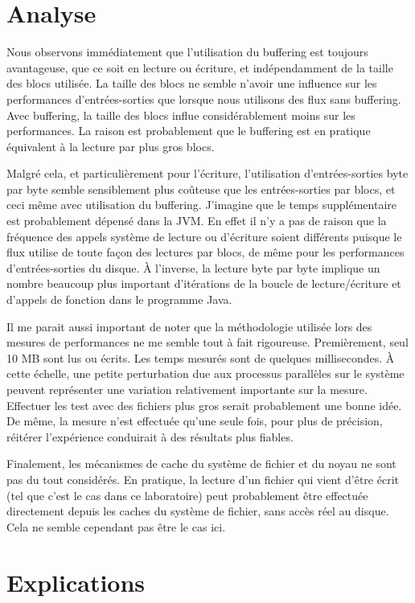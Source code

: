 \documentclass[a4paper,11pt]{article}
\begin{document}
\section{Analyse}

Nous observons immédiatement que l'utilisation du buffering est toujours avantageuse, que ce soit en lecture ou écriture, et indépendamment de la taille des blocs utilisée. La taille des blocs ne semble n'avoir une influence sur les performances d'entrées-sorties que lorsque nous utilisons des flux sans buffering. Avec buffering, la taille des blocs influe considérablement moins sur les performances. La raison est probablement que le buffering est en pratique équivalent à la lecture par plus gros blocs.

Malgré cela, et particulièrement pour l'écriture, l'utilisation d'entrées-sorties byte par byte semble sensiblement plus coûteuse que les entrées-sorties par blocs, et ceci même avec utilisation du buffering. J'imagine que le temps supplémentaire est probablement dépensé dans la JVM. En effet il n'y a pas de raison que la fréquence des appels système de lecture ou d'écriture soient différents puisque le flux utilise de toute façon des lectures par blocs, de même pour les performances d'entrées-sorties du disque. À l'inverse, la lecture byte par byte implique un nombre beaucoup plus important d'itérations de la boucle de lecture/écriture et d'appels de fonction dans le programme Java.

Il me parait aussi important de noter que la méthodologie utilisée lors des mesures de performances ne me semble tout à fait rigoureuse. Premièrement, seul 10 MB sont lus ou écrits. Les temps mesurés sont de quelques millisecondes. À cette échelle, une petite perturbation due aux processus parallèles sur le système peuvent représenter une variation relativement importante sur la mesure. Effectuer les test avec des fichiers plus gros serait probablement une bonne idée. De même, la mesure n'est effectuée qu'une seule fois, pour plus de précision, réitérer l'expérience conduirait à des résultats plus fiables.

Finalement, les mécanismes de cache du système de fichier et du noyau ne sont pas du tout considérés. En pratique, la lecture d'un fichier qui vient d'être écrit (tel que c'est le cas dans ce laboratoire) peut probablement être effectuée directement depuis les caches du système de fichier, sans accès réel au disque. Cela ne semble cependant pas être le cas ici.

\section{Explications}
\end{document}
